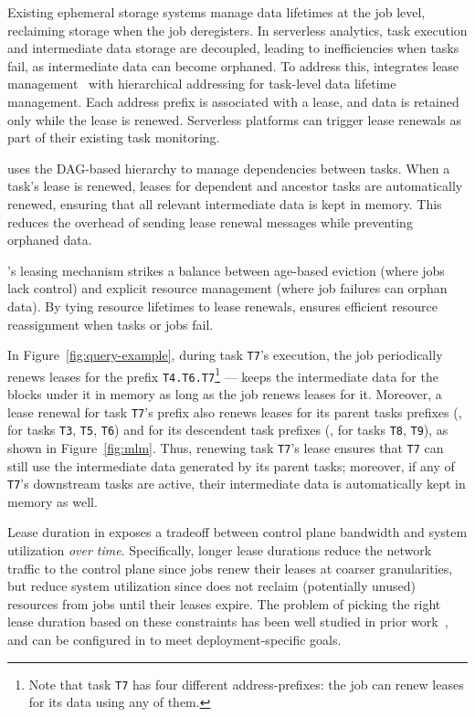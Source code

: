 Existing ephemeral storage systems manage data lifetimes at the job level, reclaiming storage when the job deregisters. In serverless analytics, task execution and intermediate data storage are decoupled, leading to inefficiencies when tasks fail, as intermediate data can become orphaned. To address this, \jiffy integrates lease management~\cite{gray1989leases, chubby, dhcplease} with hierarchical addressing for task-level data lifetime management. Each address prefix is associated with a lease, and data is retained only while the lease is renewed. Serverless platforms can trigger lease renewals as part of their existing task monitoring.

\jiffy uses the DAG-based hierarchy to manage dependencies between tasks. When a task’s lease is renewed, leases for dependent and ancestor tasks are automatically renewed, ensuring that all relevant intermediate data is kept in memory. This reduces the overhead of sending lease renewal messages while preventing orphaned data.

\jiffy’s leasing mechanism strikes a balance between age-based eviction (where jobs lack control) and explicit resource management (where job failures can orphan data). By tying resource lifetimes to lease renewals, \jiffy ensures efficient resource reassignment when tasks or jobs fail.

 In Figure~\ref{fig:query-example}, during task \texttt{T7}'s execution, the job periodically renews leases for the prefix \texttt{T4.T6.T7}\footnote{Note that task \texttt{T7} has four different address-prefixes: the job can renew leases for its data using any of them.} --- \jiffy keeps the intermediate data for the blocks under it in memory as long as the job renews leases for it. Moreover, a lease renewal for task \texttt{T7}'s prefix also renews leases for its parent tasks prefixes (\ie, for tasks \texttt{T3}, \texttt{T5}, \texttt{T6}) and for its descendent task prefixes (\ie, for tasks \texttt{T8}, \texttt{T9}), as shown in Figure~\ref{fig:mlm}. Thus, renewing task \texttt{T7}'s lease ensures that \texttt{T7} can still use the intermediate data generated by its parent tasks; moreover, if any of \texttt{T7}'s downstream tasks are active, their intermediate data is automatically kept in memory as well.



 Lease duration in \jiffy exposes a tradeoff between control plane bandwidth and system utilization \textit{over time}. Specifically, longer lease durations reduce the network traffic to the control plane since jobs renew their leases at coarser granularities, but reduce system utilization since \jiffy does not reclaim (potentially unused) resources from jobs until their leases expire. The problem of picking the right lease duration based on these constraints has been well studied in prior work~\cite{chubby, gray1989leases}, and can be configured in \jiffy to meet deployment-specific goals.


